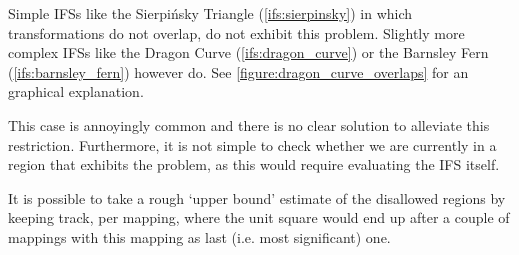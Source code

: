 \documentclass[11pt]{article}
\begin{document}
\begin{enumerate}
Simple IFSs like the Sierpińsky Triangle (\autoref{ifs:sierpinsky}) in which transformations
do not overlap, do not exhibit this problem. 
Slightly more complex IFSs like the Dragon Curve (\autoref{ifs:dragon_curve}) or the Barnsley Fern (\autoref{ifs:barnsley_fern}) however do.
See \autoref{figure:dragon_curve_overlaps} for an graphical explanation.


This case is annoyingly common and there is no clear solution to alleviate this restriction.
Furthermore, it is not simple to check whether we are currently in a region that exhibits the problem,
as this would require evaluating the IFS itself.

It is possible to take a rough `upper bound' estimate of the disallowed regions by keeping track, 
per mapping, where the unit square would end up after a couple of mappings with this mapping as last (i.e. most significant) one.



\end{enumerate}
\end{document}
